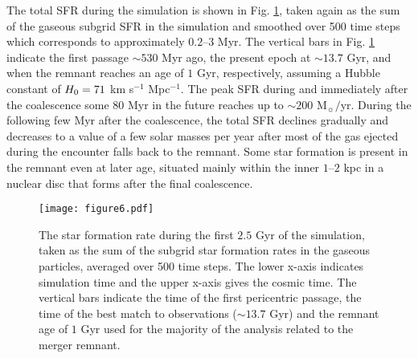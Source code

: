 \documentclass[a4paper,fleqn,usenatbib]{mnras}
\begin{document}
The total SFR during the simulation is shown in Fig. \ref{fig:Antennae_sfr}, taken again as the sum of the gaseous subgrid SFR in the simulation and
smoothed over 500 time steps which corresponds to approximately $0.2$--$3$ Myr.
The vertical bars in Fig. \ref{fig:Antennae_sfr} indicate the first passage $\sim 530$ Myr ago, the present epoch at 
$\sim13.7$ Gyr, and when the remnant reaches an age of $1$ Gyr, respectively, assuming a Hubble constant of $H_{\rm{0}}=71$ km s$^{-1}$ Mpc$^{-1}$. 
The peak SFR during and immediately after the coalescence some $80$ Myr in the future
reaches up to $\sim 200$ M$_{\sun}/$yr. During the following few Myr after the coalescence, the total SFR
declines gradually and decreases to a value of a few 
solar masses per year after most of the gas ejected during the encounter 
falls back to the remnant. Some star
formation is present in the remnant even at later age, situated mainly within the inner $1$--$2$ kpc
in a nuclear disc that forms after the final coalescence.

\begin{figure}
\texttt{[image: figure6.pdf]}
\caption{The star formation rate during the first $2.5$ Gyr of the simulation, taken
as the sum of the subgrid star formation rates in the gaseous particles, averaged over 500 
time steps. The lower x-axis indicates simulation time and the upper x-axis gives the 
cosmic time. The vertical bars indicate the time of the first 
pericentric passage, the time of the best match to observations ($\sim13.7$ 
Gyr) and the remnant age of $1$ Gyr used for the majority of the analysis related to the merger remnant.}
\label{fig:Antennae_sfr}
\end{figure}
\end{document}
